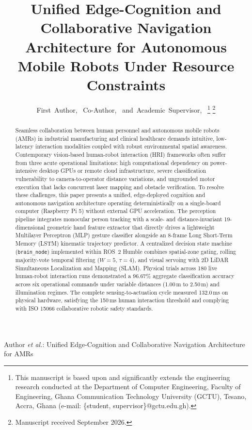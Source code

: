 \documentclass[journal]{IEEEtran}
\begin{document}
\title{Unified Edge-Cognition and Collaborative Navigation Architecture for Autonomous Mobile Robots Under Resource Constraints}

\author{
First~Author,~
Co-Author,~
and~Academic~Supervisor,~%
\thanks{This manuscript is based upon and significantly extends the engineering research conducted at the Department of Computer Engineering, Faculty of Engineering, Ghana Communication Technology University (GCTU), Tesano, Accra, Ghana (e-mail: \{student, supervisor\}@gctu.edu.gh).}%
\thanks{Manuscript received September 2026.}
}

%
{Author \MakeLowercase{\textit{et al.}}: Unified Edge-Cognition and Collaborative Navigation Architecture for AMRs}

\maketitle

\begin{abstract}
Seamless collaboration between human personnel and autonomous mobile robots (AMRs) in industrial manufacturing and clinical healthcare demands intuitive, low-latency interaction modalities coupled with robust environmental spatial awareness. Contemporary vision-based human-robot interaction (HRI) frameworks often suffer from three acute operational limitations: high computational dependency on power-intensive desktop GPUs or remote cloud infrastructure, severe classification vulnerability to camera-to-operator distance variations, and ungrounded motor execution that lacks concurrent laser mapping and obstacle verification. To resolve these challenges, this paper presents a unified, edge-deployed cognition and autonomous navigation architecture operating deterministically on a single-board computer (Raspberry Pi 5) without external GPU acceleration. The perception pipeline integrates monocular person tracking with a scale- and distance-invariant 19-dimensional geometric hand feature extractor that directly drives a lightweight Multilayer Perceptron (MLP) gesture classifier alongside an 8-frame Long Short-Term Memory (LSTM) kinematic trajectory predictor. A centralized decision state machine (\texttt{brain\_node}) implemented within ROS~2 Humble combines spatial-zone gating, rolling majority-vote temporal filtering ($W=5$, $\tau=4$), and visual servoing with 2D LiDAR Simultaneous Localization and Mapping (SLAM). Physical trials across 180 live human-robot interaction runs demonstrated a 96.67\% aggregate classification accuracy across six operational commands under variable distances (1.00\,m to 2.50\,m) and illumination regimes. The complete sensing-to-actuation cycle measured 132.0\,ms on physical hardware, satisfying the 150\,ms human interaction threshold and complying with ISO 15066 collaborative robotic safety standards.
\end{abstract}
\end{document}
